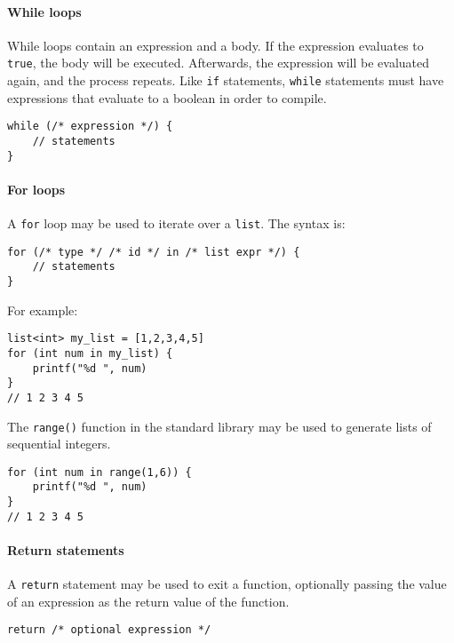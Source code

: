\paragraph{While loops}\label{while-loops}

While loops contain an expression and a body. If the expression
evaluates to \texttt{true}, the body will be executed. Afterwards, the
expression will be evaluated again, and the process repeats. Like
\texttt{if} statements, \texttt{while} statements must have expressions
that evaluate to a boolean in order to compile.

\begin{verbatim}
while (/* expression */) {
    // statements
}
\end{verbatim}

\paragraph{For loops}\label{for-loops}

A \texttt{for} loop may be used to iterate over a \texttt{list}. The
syntax is:

\begin{verbatim}
for (/* type */ /* id */ in /* list expr */) {
    // statements
}
\end{verbatim}

For example:

\begin{verbatim}
list<int> my_list = [1,2,3,4,5]
for (int num in my_list) {
    printf("%d ", num)
}
// 1 2 3 4 5
\end{verbatim}

The \texttt{range()} function in the standard library may be used to
generate lists of sequential integers.

\begin{verbatim}
for (int num in range(1,6)) {
    printf("%d ", num)
}
// 1 2 3 4 5
\end{verbatim}

\paragraph{Return statements}\label{return-statements}

A \texttt{return} statement may be used to exit a function, optionally
passing the value of an expression as the return value of the function.

\begin{verbatim}
return /* optional expression */
\end{verbatim}

